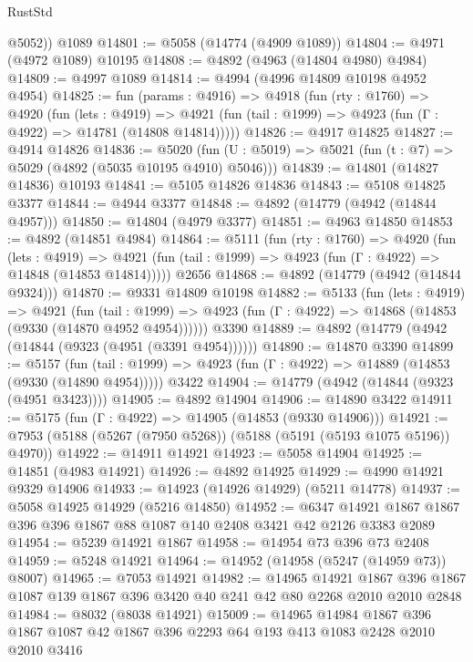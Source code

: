 \begin{lexlean}{RustStd}
\begin{coremodule}
        @5052))
    @1089
@14801 := @5058 (@14774 (@4909 @1089))
@14804 := @4971 (@4972 @1089) @10195
@14808 := @4892 (@4963 (@14804 @4980) @4984)
@14809 := @4997 @1089
@14814 := @4994 (@4996 @14809 @10198 @4952 @4954)
@14825 := fun (params : @4916) =>
  @4918
    (fun (rty : @1760) =>
    @4920
      (fun (lets : @4919) =>
      @4921 (fun (tail : @1999) => @4923 (fun (Γ : @4922) => @14781 (@14808 @14814)))))
@14826 := @4917 @14825
@14827 := @4914 @14826
@14836 := @5020
    (fun (U : @5019) => @5021 (fun (t : @7) => @5029 (@4892 (@5035 @10195 @4910) @5046)))
@14839 := @14801 (@14827 @14836) @10193
@14841 := @5105 @14826 @14836
@14843 := @5108 @14825 @3377
@14844 := @4944 @3377
@14848 := @4892 (@14779 (@4942 (@14844 @4957)))
@14850 := @14804 (@4979 @3377)
@14851 := @4963 @14850
@14853 := @4892 (@14851 @4984)
@14864 := @5111
    (fun (rty : @1760) =>
    @4920
      (fun (lets : @4919) =>
      @4921 (fun (tail : @1999) => @4923 (fun (Γ : @4922) => @14848 (@14853 @14814)))))
    @2656
@14868 := @4892 (@14779 (@4942 (@14844 @9324)))
@14870 := @9331 @14809 @10198
@14882 := @5133
    (fun (lets : @4919) =>
    @4921
      (fun (tail : @1999) =>
      @4923 (fun (Γ : @4922) => @14868 (@14853 (@9330 (@14870 @4952 @4954))))))
    @3390
@14889 := @4892 (@14779 (@4942 (@14844 (@9323 (@4951 (@3391 @4954))))))
@14890 := @14870 @3390
@14899 := @5157
    (fun (tail : @1999) => @4923 (fun (Γ : @4922) => @14889 (@14853 (@9330 (@14890 @4954)))))
    @3422
@14904 := @14779 (@4942 (@14844 (@9323 (@4951 @3423))))
@14905 := @4892 @14904
@14906 := @14890 @3422
@14911 := @5175 (fun (Γ : @4922) => @14905 (@14853 (@9330 @14906)))
@14921 := @7953 (@5188 (@5267 (@7950 @5268)) (@5188 (@5191 (@5193 @1075 @5196)) @4970))
@14922 := @14911 @14921
@14923 := @5058 @14904
@14925 := @14851 (@4983 @14921)
@14926 := @4892 @14925
@14929 := @4990 @14921 @9329 @14906
@14933 := @14923 (@14926 @14929) (@5211 @14778)
@14937 := @5058 @14925 @14929 (@5216 @14850)
@14952 := @6347 @14921 @1867 @1867 @396 @396 @1867 @88 @1087 @140 @2408 @3421 @42 @2126 @3383 @2089
@14954 := @5239 @14921 @1867
@14958 := @14954 @73 @396 @73 @2408
@14959 := @5248 @14921
@14964 := @14952 (@14958 (@5247 (@14959 @73)) @8007)
@14965 := @7053 @14921
@14982 := @14965
    @14921
    @1867
    @396
    @1867
    @1087
    @139
    @1867
    @396
    @3420
    @40
    @241
    @42
    @80
    @2268
    @2010
    @2010
    @2848
@14984 := @8032 (@8038 @14921)
@15009 := @14965
    @14984
    @1867
    @396
    @1867
    @1087
    @42
    @1867
    @396
    @2293
    @64
    @193
    @413
    @1083
    @2428
    @2010
    @2010
    @3416

\end{coremodule}
\end{lexlean}
